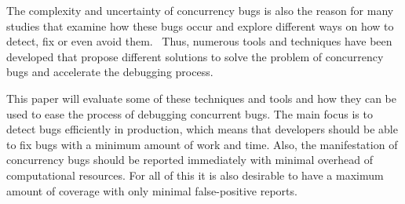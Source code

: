 \documentclass[conference]{IEEEtran}
\begin{document}
The complexity and uncertainty of concurrency bugs is also the reason for many studies that examine how these bugs occur and explore different ways on how to detect, fix or even avoid them.~\cite{tu2019go}
Thus, numerous tools and techniques have been developed that propose different solutions to solve the problem of concurrency bugs and accelerate the debugging process.

This paper will evaluate some of these techniques and tools and how they can be used to ease the process of debugging concurrent bugs.
The main focus is to detect bugs efficiently in production, which means that developers should be able to fix bugs with a minimum amount of work and time.
Also, the manifestation of concurrency bugs should be reported immediately with minimal overhead of computational resources.
For all of this it is also desirable to have a maximum amount of coverage with only minimal false-positive reports.
\end{document}
